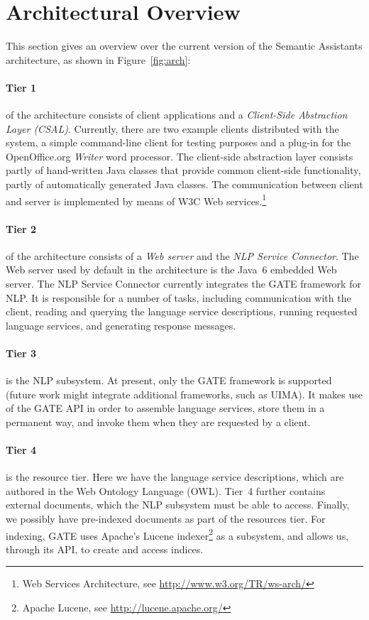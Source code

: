 \section{Architectural Overview}
\label{sec:implementation}
This section gives an overview over the current version of the Semantic
Assistants architecture, as shown in Figure~\ref{fig:arch}:

\paragraph{Tier 1} of the architecture consists of client applications
and a \emph{Client-Side Abstraction Layer (CSAL)}. Currently, there
are two example clients distributed with the system, a simple
command-line client for testing purposes and a plug-in for the
OpenOffice.org \emph{Writer} word processor. The client-side abstraction
layer consists partly of hand-written Java classes that provide
common client-side functionality, partly of automatically generated
Java classes. The communication between client and server is
implemented by means of W3C Web services.\footnote{Web Services Architecture, see
  \url{http://www.w3.org/TR/ws-arch/}} 

\paragraph{Tier 2} of the architecture consists of a \emph{Web server}
and the \emph{NLP Service Connector}. The Web server used by default
in the architecture is the Java~6 embedded Web server.  The NLP
Service Connector currently integrates the GATE framework for NLP. It
is responsible for a number of tasks, including communication with the
client, reading and querying the language service descriptions,
running requested language services, and generating response messages.

\paragraph{Tier 3} is the NLP subsystem. At present, only the GATE
framework is supported (future work might integrate additional
frameworks, such as UIMA).  It makes use of the GATE API in order to
assemble language services, store them in a permanent way, and invoke
them when they are requested by a client.

\paragraph{Tier 4} is the resource tier.  Here we have the language
service descriptions, which are authored in the Web Ontology Language
(OWL).  Tier~4 further contains external documents, which the NLP
subsystem must be able to access. Finally, we possibly have
pre-indexed documents as part of the resources tier. For indexing,
GATE uses Apache's Lucene indexer\footnote{Apache Lucene, see
  \url{http://lucene.apache.org/}} as a subsystem, and allows us,
through its API, to create and access indices.



